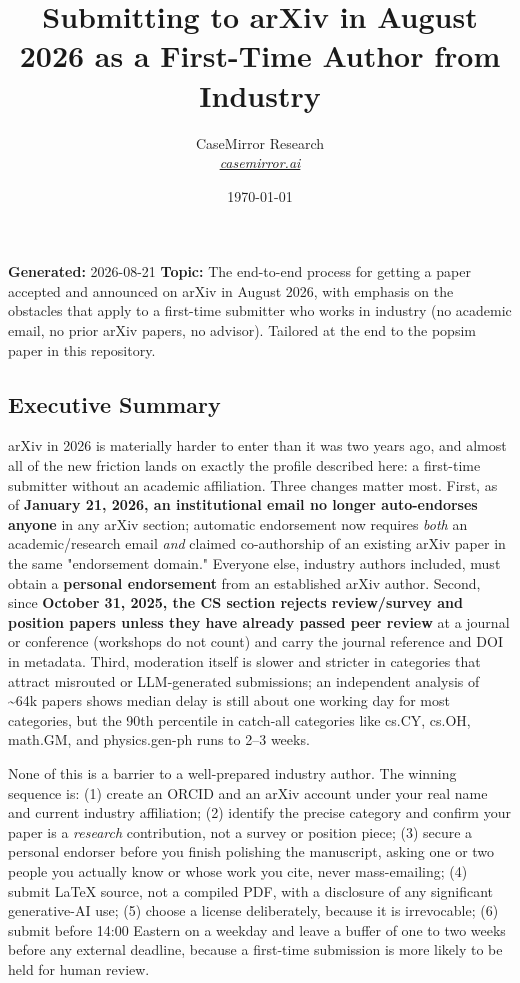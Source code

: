 \documentclass[twocolumn,10pt,letterpaper]{article}
\title{\vspace{-1.8em}\LARGE\bfseries\color{titlebg} Submitting to arXiv in August 2026 as a First-Time Author from Industry\vspace{-0.3em}}
\author{CaseMirror Research \\ \small\itshape\href{https://casemirror.ai}{\textcolor{headergray}{casemirror.ai}}}
\date{{\small\color{headergray} \today}}
\begin{document}
\renewcommand{\UrlFont}{\small\ttfamily}
\raggedbottom
\sloppy

\maketitle
\thispagestyle{firstpage}
\vspace{-0.5em}


\textbf{Generated:} 2026-08-21 \textbf{Topic:} The end-to-end process for getting a paper accepted and announced on arXiv in August 2026, with emphasis on the obstacles that apply to a first-time submitter who works in industry (no academic email, no prior arXiv papers, no advisor). Tailored at the end to the popsim paper in this repository.


\subsection{Executive Summary}

arXiv in 2026 is materially harder to enter than it was two years ago, and almost all of the new friction lands on exactly the profile described here: a first-time submitter without an academic affiliation. Three changes matter most. First, as of \textbf{January 21, 2026, an institutional email no longer auto-endorses anyone} in any arXiv section; automatic endorsement now requires \textit{both} an academic/research email \textit{and} claimed co-authorship of an existing arXiv paper in the same "endorsement domain." Everyone else, industry authors included, must obtain a \textbf{personal endorsement} from an established arXiv author. Second, since \textbf{October 31, 2025, the CS section rejects review/survey and position papers unless they have already passed peer review} at a journal or conference (workshops do not count) and carry the journal reference and DOI in metadata. Third, moderation itself is slower and stricter in categories that attract misrouted or LLM-generated submissions; an independent analysis of \textasciitilde{}64k papers shows median delay is still about one working day for most categories, but the 90th percentile in catch-all categories like cs.CY, cs.OH, math.GM, and physics.gen-ph runs to 2–3 weeks.


None of this is a barrier to a well-prepared industry author. The winning sequence is: (1) create an ORCID and an arXiv account under your real name and current industry affiliation; (2) identify the precise category and confirm your paper is a \textit{research} contribution, not a survey or position piece; (3) secure a personal endorser before you finish polishing the manuscript, asking one or two people you actually know or whose work you cite, never mass-emailing; (4) submit LaTeX source, not a compiled PDF, with a disclosure of any significant generative-AI use; (5) choose a license deliberately, because it is irrevocable; (6) submit before 14:00 Eastern on a weekday and leave a buffer of one to two weeks before any external deadline, because a first-time submission is more likely to be held for human review.
\end{document}
